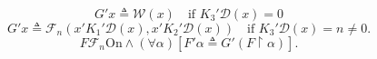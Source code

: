 $$G'x \triangleq \mathcal{W}(x) \quad \text{if } K_3' \mathcal{D}(x) = 0$$
$$G'x \triangleq \mathcal{F}_n(x'K_1' \mathcal{D}(x), x'K_2' \mathcal{D}(x)) \quad \text{if } K_3' \mathcal{D}(x) = n \neq 0.$$
$$F \mathcal{F}_n \mathrm{On} \land (\forall \alpha)[F' \alpha \triangleq G'(F \upharpoonright \alpha)].$$
